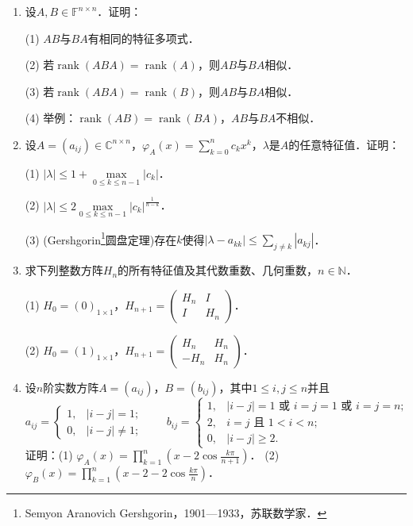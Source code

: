 \documentclass[a4paper,fontset=windows]{ctexbook}
\theoremstyle{definition}
\DeclareMathOperator{\diag}{diag}
\DeclareMathOperator{\rank}{rank}
\DeclareMathOperator{\tr}{tr}
\renewcommand{\le}{\leqslant}
\renewcommand{\ge}{\geqslant}
\begin{document}
\begin{enumerate}
(3) $\tr(A)=\tr(B)$是$A$与$B$相似的充分必要条件．

\item 设$A,B\in\mathbb{F}^{n\times n}$．证明：

(1) $AB$与$BA$有相同的特征多项式．

(2) 若$\rank(ABA)=\rank(A)$，则$AB$与$BA$相似．

(3) 若$\rank(ABA)=\rank(B)$，则$AB$与$BA$相似．

(4) 举例：$\rank(AB)=\rank(BA)$，$AB$与$BA$不相似．

\item 设$A=(a_{ij})\in\mathbb{C}^{n\times n}$，$\varphi_A(x)=\sum\limits_{k=0}^nc_kx^k$，$\lambda$是$A$的任意特征值．证明：

(1) $|\lambda|\le 1+\max\limits_{0\le k\le n-1}|c_k|$．

(2) $|\lambda|\le 2\max\limits_{0\le k\le n-1}|c_k|^{\frac{1}{n-k}}$．

(3) (Gershgorin\footnote{Semyon Aranovich Gershgorin，1901—1933，苏联数学家．}圆盘定理)存在$k$使得$|\lambda-a_{kk}|\le\sum\limits_{j\ne k}|a_{kj}|$．

\item 求下列整数方阵$H_n$的所有特征值及其代数重数、几何重数，$n\in\mathbb{N}$．

(1) $H_0=(0)_{1\times 1}$，$H_{n+1}=\begin{pmatrix}H_n&I \\ I&H_n\end{pmatrix}$．

(2) $H_0=(1)_{1\times 1}$，$H_{n+1}=\begin{pmatrix}H_n&H_n \\ -H_n&H_n\end{pmatrix}$．

\item 设$n$阶实数方阵$A=(a_{ij})$，$B=(b_{ij})$，其中$1\le i,j\le n$并且
$$a_{ij}=\begin{cases}1,&|i-j|=1; \\ 0,&|i-j|\ne 1;\end{cases}\qquad b_{ij}=\begin{cases}1,&|i-j|=1\text{~或~}i=j=1\text{~或~}i=j=n; \\ 2,&i=j\text{~且~}1<i<n; \\ 0,&|i-j|\ge 2.\end{cases}$$
证明：(1) $\varphi_A(x)=\prod\limits_{k=1}^n\left(x-2\cos\frac{k\pi}{n+1}\right)$．\quad
(2) $\varphi_B(x)=\prod\limits_{k=1}^n\left(x-2-2\cos\frac{k\pi}{n}\right)$．


\end{enumerate}
\end{document}
